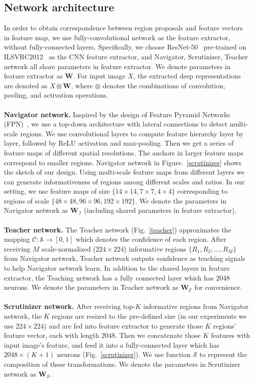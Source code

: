 \documentclass[runningheads]{llncs}
\begin{document}
\subsection{Network architecture}\label{sec_architecture}
In order to obtain correspondence between region proposals and feature vectors in feature map, we use fully-convolutional network as the feature extractor, without fully-connected layers. Specifically, we choose ResNet-50~\cite{he2016deep} pre-trained on ILSVRC2012~\cite{ILSVRC15} as the CNN feature extractor, and Navigator, Scrutinizer, Teacher network all share parameters in feature extractor. We denote parameters in feature extractor as $\mathbf W $. For input image $X$, the extracted deep representations are denoted as $X \otimes \mathbf W$, where $\otimes$ denotes the combinations of convolution, pooling, and activation operations.\\\\
\textbf{Navigator network.}
Inspired by the design of Feature Pyramid Networks (FPN)~\cite{Lin_2017_CVPR}, we use a top-down architecture with lateral connections to detect multi-scale regions. We use convolutional layers to compute feature hierarchy layer by layer, followed by ReLU activation and max-pooling. Then we get a series of feature maps of different spatial resolutions. The anchors in larger feature maps correspond to smaller regions. Navigator network in Figure.~\ref{scrutinizer} shows the sketch of our design. Using multi-scale feature maps from different layers we can generate informativeness of regions among different scales and ratios. In our setting, we use feature maps of size $\{14 \times 14, 7 \times 7, 4 \times 4\}$ corresponding to regions of  scale $\{48 \times 48, 96 \times 96, 192 \times 192\}$. We denote the parameters in Navigator network as $\mathbf W_{\mathcal I}$ (including shared parameters in feature extractor).\\\\
\textbf{Teacher network.}
The Teacher network (Fig.~\ref{teacher}) approximates the mapping $\mathcal C: \mathbb A \to [0,1]$ which denotes the confidence of each region. After receiving $M$ scale-normalized ($224 \times 224$) informative regions $\{R_1, R_2, \dots, R_M\}$ from Navigator network, Teacher network outputs confidence as teaching signals to help Navigator network learn. In addition to the shared layers in feature extractor, the Teaching network has a fully connected layer which has $2048$ neurons. We denote the parameters in Teacher network as $\mathbf W_{\mathcal C}$ for convenience.\\\\
\textbf{Scrutinizer network.}
After receiving top-$K$ informative regions from Navigator network, the $K$ regions are resized to the pre-defined size (in our experiments we use $224 \times 224$) and are fed into feature extractor to generate those $K$ regions' feature vector, each with length $2048$. Then we concatenate those $K$ features with input image's feature, and feed it into a fully-connected layer which has $2048\times(K+1)$ neurons (Fig.~\ref{scrutinizer}).  We use function $\mathcal S$ to represent the composition of these transformations. We denote the parameters in Scrutinizer network as $\mathbf W_{\mathcal S}$. 
\end{document}
